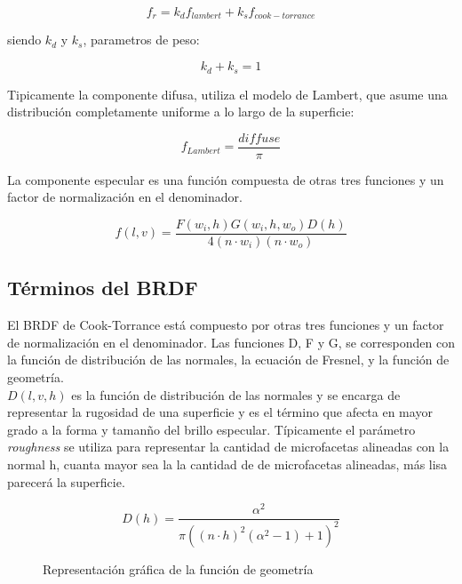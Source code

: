         \begin{equation}
        f_r = k_{d}f_{lambert} + k_sf_{cook-torrance}
        \end{equation}
        
        siendo $k_d$ y $k_s$, parametros de peso:

        \begin{equation}
        k_d + k_s = 1
        \end{equation}

        Tipicamente la componente difusa, utiliza el modelo de Lambert, que asume una distribución completamente uniforme a lo
        largo de la superficie:

        \begin{equation}
        f_{Lambert} = \frac{diffuse}{\pi}
        \end{equation}

        La componente especular es una funci\'on compuesta de otras tres funciones y un factor de normalizaci\'on en el
        denominador.

        \begin{equation}
            f(l, v) = \frac{F(w_i, h) G(w_i, h, w_o) D(h)} {4(n\cdot{w_i}) (n \cdot{w_o})}
        \end{equation}

    \subsection{T\'erminos del BRDF}
        El BRDF de Cook-Torrance est\'a compuesto por otras tres funciones y un factor de normalizaci\'on en el denominador.
        Las funciones D, F y G, se corresponden con la funci\'on de distribuci\'on de las normales, la ecuaci\'on de Fresnel,
        y la funci\'on de geometr\'ia.\\

        $D(l, v, h)$  es la funci\'on de distribuci\'on de las normales y se encarga de representar la rugosidad de una superficie
        y es el t\'ermino que afecta en mayor grado a la forma y taman\~no del brillo especular. T\'ipicamente el par\'ametro
        \textit{roughness} se utiliza para representar la cantidad de microfacetas alineadas con la normal h, cuanta mayor sea la
        la cantidad de de microfacetas alineadas, m\'as lisa parecer\'a la superficie.

        $$
        D(h) = \frac{\alpha^2}{\pi((n\cdot{h})^2(\alpha^2 - 1) + 1)^2}
        $$

        \begin{figure}[H]
            \vspace{0.5cm}
            \centering
            \caption{Representaci\'on gr\'afica de la funci\'on de geometr\'ia}
        \end{figure}

